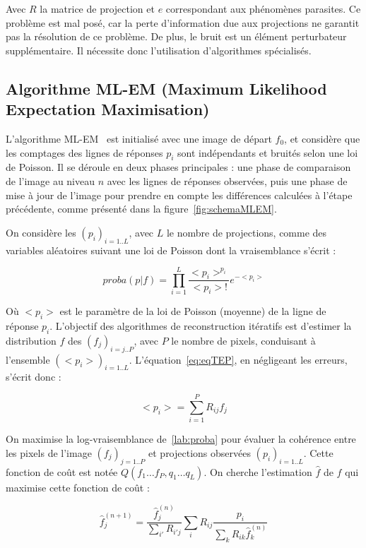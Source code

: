 Avec $R$ la matrice de projection et $e$ correspondant aux phénomènes parasites. Ce problème est mal posé, car la perte d'information due aux projections ne garantit pas la résolution de ce problème. De plus, le bruit est un élément perturbateur supplémentaire. Il nécessite donc l'utilisation d'algorithmes spécialisés. 


		\subsection{Algorithme ML-EM (Maximum Likelihood Expectation Maximisation) }


L'algorithme ML-EM~\cite{shepp1982maximum} est initialisé avec une image de départ $f_0$, et considère que les comptages des lignes de réponses $p_i$ sont indépendants et bruités selon une loi de Poisson. Il se déroule en deux phases principales : une phase de comparaison de l'image au niveau $n$ avec les lignes de réponses observées, puis une phase de mise à jour de l'image pour prendre en compte les différences calculées à l'étape précédente, comme présenté dans la figure~\ref{fig:schemaMLEM}.

On considère les $(p_i)_{i=1..L}$, avec $L$ le nombre de projections, comme des variables aléatoires suivant une loi de Poisson dont la vraisemblance s'écrit :

\begin{equation}
proba(p|f) = \prod\limits_{i=1}^{L} \frac{<p_i>^{p_i}}{<p_i> !} e^{-<p_i>}
\label{lab:proba}
\end{equation}

Où $<p_i>$ est le paramètre de la loi de Poisson (moyenne) de la ligne de réponse $p_i$. L'objectif des algorithmes de reconstruction itératifs est d'estimer la distribution $f$ des $(f_j)_{i=j..P}$, avec $P$ le nombre de pixels, conduisant à l'ensemble $(<p_i>)_{i=1..L}$. L'équation~\ref{eq:eqTEP}, en négligeant les erreurs, s'écrit donc :

\begin{equation}
<p_i> = \sum\limits_{i=1}^{P} R_{ij}f_j
\end{equation}

On maximise la log-vraisemblance de~\ref{lab:proba} pour évaluer la cohérence entre les pixels de l'image $(f_j)_{j=1..P}$ et projections observées $(p_i)_{i=1..L}$. Cette fonction de coût est notée $Q(f_1 \dots f_P, q_1 \dots q_L)$. On cherche l'estimation $\hat{f}$ de $f$ qui maximise cette fonction de coût :

\begin{equation}
	\hat{f}_j^{(n+1)}=\frac{\hat{f}_j^{(n)}}{\sum\limits_{i'}R_{i'j}}\sum\limits_{i}R_{ij}\frac{p_i}{\sum\limits_{k}R_{ik}\hat{f}_k^{(n)}}
\label{eq:MLEM}
\end{equation}

